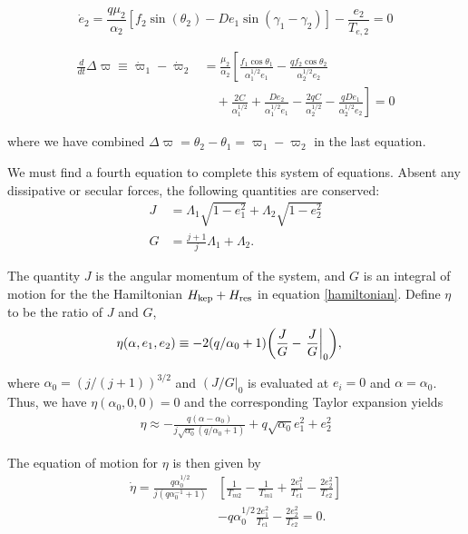 \documentclass{mnras}
\DeclarePairedDelimiter{\p}{(}{)}
\begin{document}
\begin{equation}
\label{dote2}
  \dot e_2 = \frac{q\mu_2}{\alpha_2} [f_2\sin(\theta_2) - De_1 \sin(\gamma_1-\gamma_2)]- \frac{e_2}{T_{e,2}}=0
\end{equation}

\begin{align}
\label{dotdpom}
  \frac{d}{dt}\Delta\varpi \equiv \dot\varpi_1-\dot\varpi_2
  &= \frac{\mu_2}{\alpha_2} \left[ \frac{f_1\cos\theta_1}{\alpha_1^{1/2} e_1}
     - \frac{qf_2\cos\theta_2}{\alpha_2^{1/2}e_2}\right.\nonumber \\
  &\quad+ \left.\frac{2C}{\alpha_1^{1/2}} + \frac{De_2}{\alpha_1^{1/2} e_1}
    - \frac{2qC}{\alpha_2^{1/2}} - \frac{qDe_1}{ \alpha_2^{1/2}e_2}\right]=0
\end{align}

where we have combined \(\Delta\varpi = \theta_2 - \theta_1 =
\varpi_1-\varpi_2\) in the last equation.

We must find a fourth equation to complete this system of equations.
Absent any dissipative or secular forces, the following quantities are
conserved:
\begin{align}
  J &= \Lambda_1\sqrt{1-e_1^2} + \Lambda_2\sqrt{1-e_2^2}\\
  G &= \frac{j+1}{j} \Lambda_1 + \Lambda_2.
\end{align}

The quantity \(J\) is the angular momentum of the system, and \(G\) is an
integral of motion for the the Hamiltonian \(H_{\rm kep}+H_{\rm res}\)
in equation \eqref{hamiltonian}.  Define \(\eta\) to be the ratio of \(J\) and \(G\),
\begin{align}
  \eta(\alpha, e_1, e_2) &\equiv - 2(q/\alpha_0+1)\p*{\frac{J}{G}-\left.\frac{J}{G}\right|_{0}},
\end{align}

where \(\alpha_0 = (j/(j+1))^{3/2}\) and \(\left(J/G\right|_{0}\) is
evaluated at \(e_i=0\) and \(\alpha=\alpha_0\).
Thus, we have \(\eta(\alpha_0, 0, 0)=0\) and the corresponding Taylor expansion yields
\begin{align}
  \eta \approx -\frac{q(\alpha-\alpha_0)}{j\sqrt{\alpha_0}(q/\alpha_0+1)} + q\sqrt{\alpha_0}e_1^2 + e_2^2
\end{align}

The equation of motion for \(\eta\) is then given by
\begin{align}
\label{doteta}
  \dot\eta = \frac{q\alpha_0^{1/2}}{j(q\alpha_0^{-1}+1)}&\left[ \frac{1}{T_{m2}} - \frac{1}{T_{m1}}
      + \frac{2e_1^2}{T_{e1}}- \frac{2e_2^2}{T_{e2}} \right] \nonumber\\
    &- q\alpha_0^{1/2}\frac{2e_1^2}{T_{e1}} - \frac{2e_2^2}{T_{e2}}=0.
\end{align}
\end{document}

